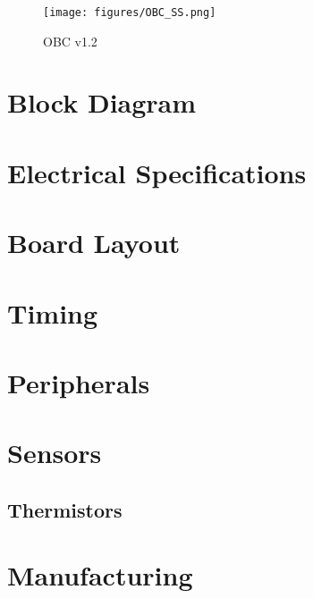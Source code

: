 \documentclass[10pt]{datasheet}
\begin{document}
\begin{figure}[H]
    \centering
    \texttt{[image: figures/OBC\_SS.png]}
    \caption{\centering OBC v1.2}
    \label{fig:enter-label}
\end{figure}

\onecolumn
\section{Block Diagram}

\section{Electrical Specifications}
\section{Board Layout}
\section{Timing}
\section{Peripherals}
\section{Sensors}
\subsection{Thermistors}
\section{Manufacturing}
\end{document}
